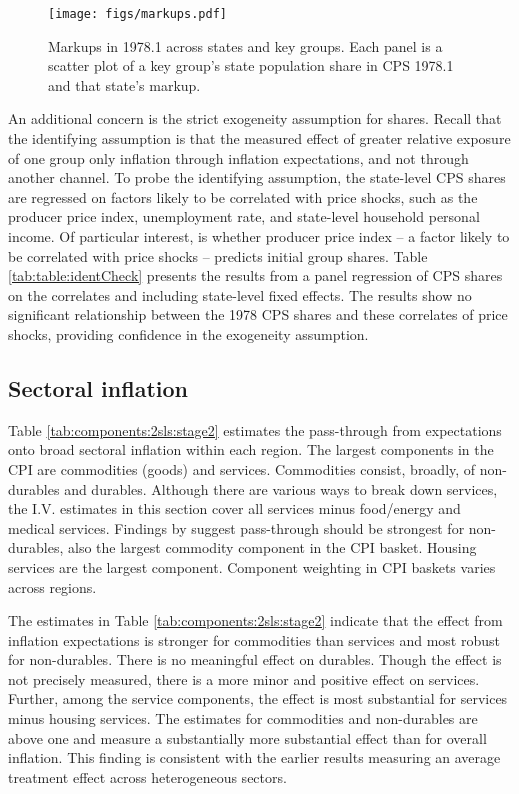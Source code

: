\documentclass[12pt]{article}
\begin{document}
\begin{figure}
\centering
\caption{Markups in 1978.1 across states and key groups. Each panel is a scatter plot of a key group's state population share in CPS 1978.1 and that state's markup.}\label{fig:markupsFig}
\centering
\texttt{[image: figs/markups.pdf]}
\end{figure}





An additional concern is the strict exogeneity assumption for shares. Recall that the identifying assumption is that the measured effect of greater relative exposure of one group only inflation through inflation expectations, and not through another channel.  To probe the identifying assumption, the state-level CPS shares are regressed on factors likely to be correlated with price shocks, such as the producer price index, unemployment rate, and state-level household personal income. Of particular interest, is whether producer price index -- a factor likely to be correlated with price shocks -- predicts initial group shares.  Table \ref{tab:table:identCheck} presents the results from a panel regression of CPS shares on the correlates and including state-level fixed effects.  The results show no significant relationship between the 1978 CPS shares and these correlates of price shocks, providing confidence in the exogeneity assumption.

\subsection{Sectoral inflation}

Table \ref{tab:components:2sls:stage2} estimates the pass-through from expectations onto broad sectoral inflation within each region. The largest components in the CPI are commodities (goods) and services. Commodities consist, broadly, of non-durables and durables. Although there are various ways to break down services, the I.V. estimates in this section cover all services minus food/energy and medical services. Findings by \cite{Dacunto:groceryJPE} suggest pass-through should be strongest for non-durables, also the largest commodity component in the CPI basket. Housing services are the largest component. Component weighting in CPI baskets varies across regions.



The estimates in Table \ref{tab:components:2sls:stage2} indicate that the effect from inflation expectations is stronger for commodities than services and most robust for non-durables. There is no meaningful effect on durables. Though the effect is not precisely measured, there is a more minor and positive effect on services. Further, among the service components, the effect is most substantial for services minus housing services. The estimates for commodities and non-durables are above one and measure a substantially more substantial effect than for overall inflation. This finding is consistent with the earlier results measuring an average treatment effect across heterogeneous sectors.
\end{document}

